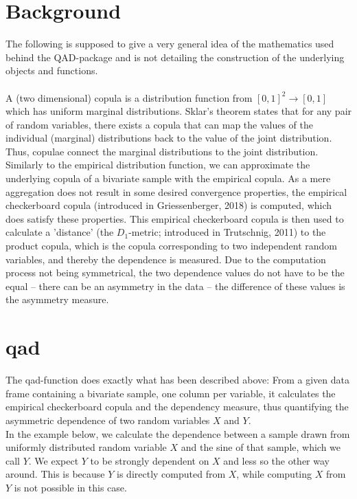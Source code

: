 \documentclass{scrartcl}\usepackage[]{graphicx}\usepackage[]{color}
\begin{document}
\section{Background}
The following is supposed to give a very general idea of the mathematics used behind the QAD-package and is not detailing the construction of the underlying objects and functions.\\\\
A (two dimensional) copula is a distribution function from $[0,1]^2 \to [0,1]$ which has uniform marginal distributions. Sklar's theorem states that for any pair of random variables, there exists a copula that can map the values of the individual (marginal) distributions back to the value of the joint distribution. Thus, copulae connect the marginal distributions to the joint distribution. 
Similarly to the empirical distribution function, we can approximate the underlying copula of a bivariate sample with the empirical copula. As a mere aggregation does not result in some desired convergence properties, the empirical checkerboard copula (introduced in Griessenberger, 2018) is computed, which does satisfy these properties. 
This empirical checkerboard copula is then used to calculate a 'distance' (the $D_1$-metric; introduced in Trutschnig, 2011) to the product copula, which is the copula corresponding to two independent random variables, and thereby the dependence is measured.
Due to the computation process not being symmetrical, the two dependence values do not have to be the equal -- there can be an asymmetry in the data -- the difference of these values is the asymmetry measure.

\section{qad}

The qad-function does exactly what has been described above: From a given data frame containing a bivariate sample, one column per variable, it calculates the empirical checkerboard copula and the dependency measure, thus quantifying the asymmetric dependence of two random variables $X$ and $Y$.\\
In the example below, we calculate the dependence between a sample drawn from uniformly distributed random variable $X$ and the sine of that sample, which we call $Y$. We expect $Y$ to be strongly dependent on $X$ and less so the other way around. This is because $Y$ is directly computed from $X$, while computing $X$ from $Y$ is not possible in this case.
\end{document}

